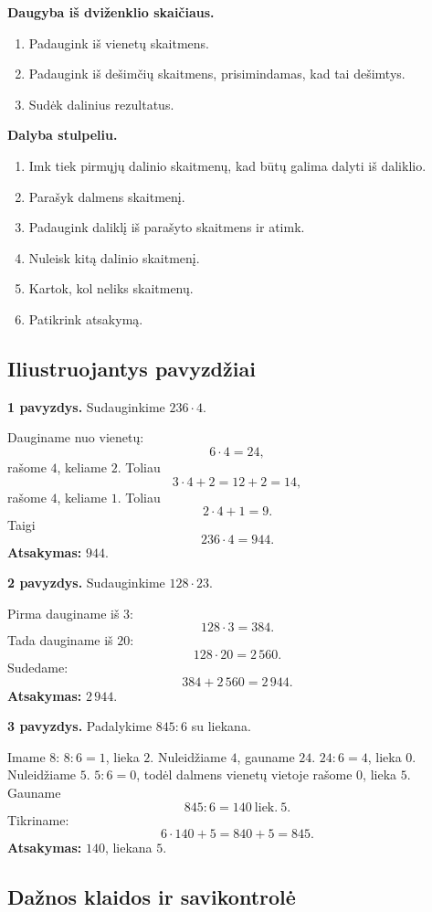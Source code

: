 \textbf{Daugyba iš dviženklio skaičiaus.}
\begin{enumerate}[label=\arabic*.]
\item Padaugink iš vienetų skaitmens.
\item Padaugink iš dešimčių skaitmens, prisimindamas, kad tai dešimtys.
\item Sudėk dalinius rezultatus.
\end{enumerate}

\textbf{Dalyba stulpeliu.}
\begin{enumerate}[label=\arabic*.]
\item Imk tiek pirmųjų dalinio skaitmenų, kad būtų galima dalyti iš daliklio.
\item Parašyk dalmens skaitmenį.
\item Padaugink daliklį iš parašyto skaitmens ir atimk.
\item Nuleisk kitą dalinio skaitmenį.
\item Kartok, kol neliks skaitmenų.
\item Patikrink atsakymą.
\end{enumerate}

\subsection{Iliustruojantys pavyzdžiai}

\textbf{1 pavyzdys.} Sudauginkime \(236\cdot4\).

Dauginame nuo vienetų:
\[
6\cdot4=24,
\]
rašome \(4\), keliame \(2\). Toliau
\[
3\cdot4+2=12+2=14,
\]
rašome \(4\), keliame \(1\). Toliau
\[
2\cdot4+1=9.
\]
Taigi
\[
236\cdot4=944.
\]
\textbf{Atsakymas:} \(944\).

\textbf{2 pavyzdys.} Sudauginkime \(128\cdot23\).

Pirma dauginame iš \(3\):
\[
128\cdot3=384.
\]
Tada dauginame iš \(20\):
\[
128\cdot20=2\,560.
\]
Sudedame:
\[
384+2\,560=2\,944.
\]
\textbf{Atsakymas:} \(2\,944\).

\textbf{3 pavyzdys.} Padalykime \(845:6\) su liekana.

Imame \(8\): \(8:6=1\), lieka \(2\). Nuleidžiame \(4\), gauname \(24\). \(24:6=4\), lieka \(0\). Nuleidžiame \(5\). \(5:6=0\), todėl dalmens vienetų vietoje rašome \(0\), lieka \(5\). Gauname
\[
845:6=140\ \text{liek.}\ 5.
\]
Tikriname:
\[
6\cdot140+5=840+5=845.
\]
\textbf{Atsakymas:} \(140\), liekana \(5\).

\subsection{Dažnos klaidos ir savikontrolė}


